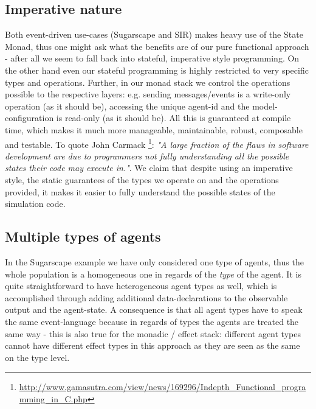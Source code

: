 \subsection{Imperative nature}
Both event-driven use-cases (Sugarscape and SIR) makes heavy use of the State Monad, thus one might ask what the benefits are of our pure functional approach - after all we seem to fall back into stateful, imperative style programming. %
On the other hand even our stateful programming is highly restricted to very specific types and operations. Further, in our monad stack we control the operations possible to the respective layers: e.g. sending messages/events is a write-only operation (as it should be), accessing the unique agent-id and the model-configuration is read-only (as it should be). All this is guaranteed at compile time, which makes it much more manageable, maintainable, robust, composable and testable.
To quote John Carmack \footnote{\url{http://www.gamasutra.com/view/news/169296/Indepth_Functional_programming_in_C.php}}: \emph{"A large fraction of the flaws in software development are due to programmers not fully understanding all the possible states their code may execute in."}. We claim that despite using an imperative style, the static guarantees of the types we operate on and the operations provided, it makes it easier to fully understand the possible states of the simulation code.


\subsection{Multiple types of agents}
In the Sugarscape example we have only considered one type of agents, thus the whole population is a homogeneous one in regards of the \textit{type} of the agent. It is quite straightforward to have heterogeneous agent types as well, which is accomplished through adding additional data-declarations to the observable output and the agent-state. A consequence is that all agent types have to speak the same event-language because in regards of types the agents are treated the same way - this is also true for the monadic / effect stack: different agent types cannot have different effect types in this approach as they are seen as the same on the type level.

